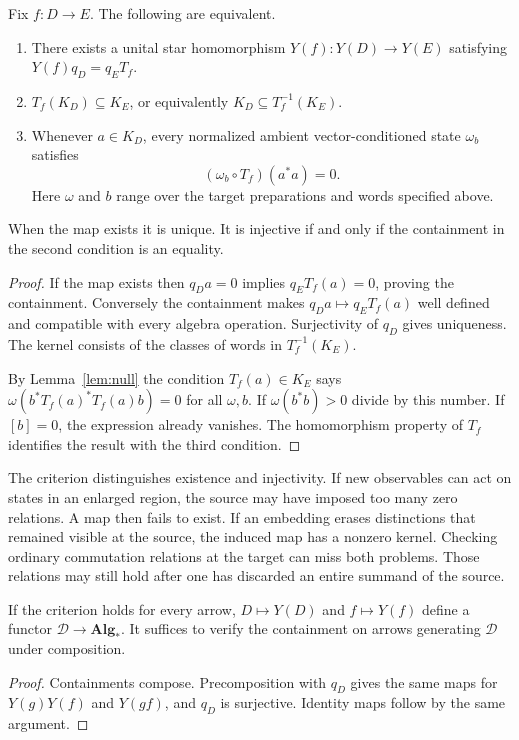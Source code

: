\documentclass[11pt,letterpaper]{article}
\newcommand{\alg}{\mathbf{Alg}_{*}}
\newcommand{\Dcat}{\mathcal D}
\begin{document}
\begin{theorem}\label{thm:transport}
Fix $f:D\to E$. The following are equivalent.
\begin{enumerate}
\item There exists a unital star homomorphism $Y(f):Y(D)\to Y(E)$ satisfying $Y(f)q_D=q_ET_f$.
\item $T_f(K_D)\subseteq K_E$, or equivalently $K_D\subseteq T_f^{-1}(K_E)$.
\item Whenever $a\in K_D$, every normalized ambient vector-conditioned state $\omega_b$ satisfies
\[
  (\omega_b\circ T_f)(a^*a)=0.
\]
Here $\omega$ and $b$ range over the target preparations and words specified above.
\end{enumerate}
When the map exists it is unique. It is injective if and only if the containment in the second condition is an equality.
\end{theorem}
\begin{proof}
If the map exists then $q_Da=0$ implies $q_ET_f(a)=0$, proving the containment. Conversely the containment makes $q_Da\mapsto q_ET_f(a)$ well defined and compatible with every algebra operation. Surjectivity of $q_D$ gives uniqueness. The kernel consists of the classes of words in $T_f^{-1}(K_E)$.

By Lemma~\ref{lem:null} the condition $T_f(a)\in K_E$ says $\omega(b^*T_f(a)^*T_f(a)b)=0$ for all $\omega,b$. If $\omega(b^*b)>0$ divide by this number. If $[b]=0$, the expression already vanishes. The homomorphism property of $T_f$ identifies the result with the third condition.
\end{proof}

The criterion distinguishes existence and injectivity. If new observables can act on states in an enlarged region, the source may have imposed too many zero relations. A map then fails to exist. If an embedding erases distinctions that remained visible at the source, the induced map has a nonzero kernel. Checking ordinary commutation relations at the target can miss both problems. Those relations may still hold after one has discarded an entire summand of the source.

\begin{corollary}[Functoriality]\label{cor:functor}
If the criterion holds for every arrow, $D\mapsto Y(D)$ and $f\mapsto Y(f)$ define a functor $\Dcat\to\alg$. It suffices to verify the containment on arrows generating $\Dcat$ under composition.
\end{corollary}
\begin{proof}
Containments compose. Precomposition with $q_D$ gives the same maps for $Y(g)Y(f)$ and $Y(gf)$, and $q_D$ is surjective. Identity maps follow by the same argument.
\end{proof}
\end{document}
